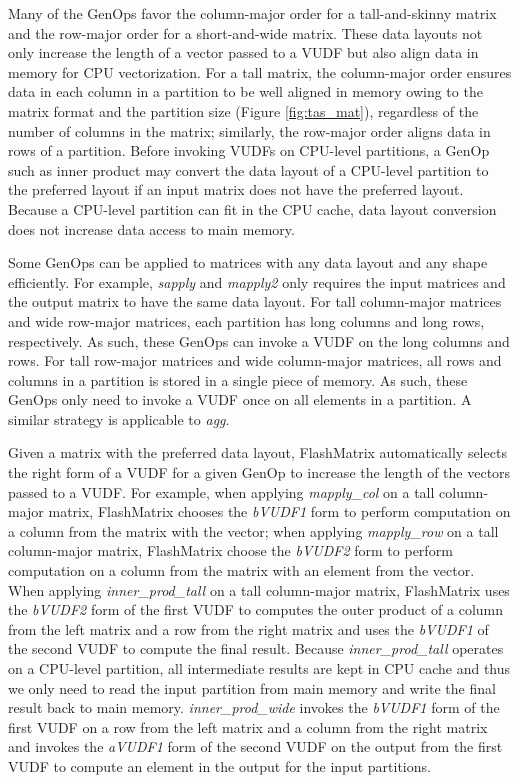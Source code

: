 Many of the GenOps favor the column-major order for a tall-and-skinny matrix
and the row-major order for a short-and-wide matrix. These data layouts not only
increase the length of a vector passed to a VUDF but also align data in memory
for CPU vectorization. For a tall matrix, the column-major order ensures data
in each column in a partition to be well aligned in memory owing to the matrix
format and the partition size (Figure \ref{fig:tas_mat}), regardless of the number
of columns in the matrix; similarly, the row-major order aligns data in rows of
a partition. Before invoking VUDFs on
CPU-level partitions, a GenOp such as inner product may convert the data layout
of a CPU-level partition to the preferred layout if an input matrix does not
have the preferred layout.
Because a CPU-level partition can fit in the CPU cache, data layout conversion
does not increase data access to main memory. 

Some GenOps can be applied to matrices with any data layout and any shape
efficiently. For example, \textit{sapply} and \textit{mapply2} only requires
the input matrices and the output matrix to have the same data layout. For tall
column-major matrices and wide row-major matrices, each partition has long
columns and long rows, respectively. As such, these GenOps can invoke a VUDF
on the long columns and rows. For tall row-major matrices and wide column-major
matrices, all rows and columns in a partition is stored in a single piece of
memory. As such, these GenOps only need to invoke a VUDF once on all elements
in a partition. A similar strategy is applicable to \textit{agg}.

Given a matrix with the preferred data layout, FlashMatrix automatically
selects the right form of a VUDF for a given GenOp to increase the length of
the vectors passed to a VUDF. For example, when applying \textit{mapply\_col}
on a tall column-major matrix, FlashMatrix chooses the \textit{bVUDF1} form to
perform computation on a column from the matrix with the vector; when applying
\textit{mapply\_row} on a tall column-major matrix, FlashMatrix choose
the \textit{bVUDF2} form to perform computation on a column from the matrix
with an element from the vector. When applying \textit{inner\_prod\_tall} on a tall
column-major matrix, FlashMatrix uses the \textit{bVUDF2} form of the first
VUDF to computes the outer product of a column from the left matrix and a row
from the right matrix and uses the \textit{bVUDF1} of the second VUDF to compute
the final result. Because \textit{inner\_prod\_tall} operates on a CPU-level
partition, all intermediate results are kept in CPU cache and thus we only need
to read the input partition from main memory and write the final result
back to main memory. \textit{inner\_prod\_wide} invokes the
\textit{bVUDF1} form of the first VUDF on a row from the left matrix and a column
from the right matrix and invokes the \textit{aVUDF1} form of the second VUDF
on the output from the first VUDF to compute an element in the output for
the input partitions.

